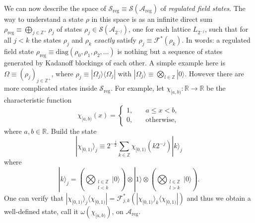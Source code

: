 \documentclass[11pt]{amsart}
\theoremstyle{plain}%
\theoremstyle{definition}
\theoremstyle{remark}
\begin{document}
We can now describe the space of $\mathcal{S}_{\text{reg}} \equiv \mathcal{S}(\mathcal{A}_{\text{reg}})$ of \emph{regulated field states}. The way to understand a state $\rho$ in this space is as an infinite direct sum $\rho_{\text{reg}} \equiv \bigoplus_{j\in \mathbb{Z}^{+}} \rho_{j}$ of states $\rho_{j} \in \mathcal{S}(\mathcal{A}_{2^{-j}})$, one for each lattice $L_{2^{-j}}$, such that for all $j<k$ the states $\rho_j$ and $\rho_k$ \emph{exactly} satisfy $\rho_j \equiv \mathcal{F}^{*}(\rho_k)$. In words: a regulated field state $\rho_{\text{reg}} \equiv \text{diag}(\rho_0, \rho_1, \rho_2, \ldots)$ is nothing but a sequence of states generated by Kadanoff blockings of each other. A simple example here is $\Omega \equiv (\rho_j)_{j\in \mathbb{Z}^+}$, where $\rho_j \equiv |\Omega_j\rangle\langle \Omega_j|$ with $|\Omega_j\rangle \equiv \bigotimes_{l\in \mathbb{Z}} |0\rangle$. However there are more complicated states inside $\mathcal{S}_{\text{reg}}$. For example, let $\chi_{[a,b)}:\mathbb{R}\rightarrow\mathbb{R}$ be the characteristic function
\begin{equation}
	\chi_{[a,b)}(x) = \begin{cases} 1,& \quad a\le x < b, \\ 0,& \quad \text{otherwise,}\end{cases}
\end{equation}
where $a,b\in\mathbb{R}$. Build the state
\begin{equation}
	|\chi_{[0,1)}\rangle_j \equiv 2^{-\frac{j}{2}}\sum_{k\in \mathbb{Z}} \chi_{[0,1)}(k2^{-j}) |k\rangle_j
\end{equation}
where 
\begin{equation}
	|k\rangle_j = \left(\bigotimes_{\substack{l\in\mathbb{Z} \\ l < k}} |0\rangle \right)\otimes |1\rangle \otimes\left(\bigotimes_{\substack{l\in\mathbb{Z} \\ l > k}} |0\rangle \right).
\end{equation}
One can verify that $|\chi_{[0,1)}\rangle_j\langle \chi_{[0,1)}| = \mathcal{F}_{j,k}^{*}(|\chi_{[0,1)}\rangle_k\langle \chi_{[0,1)}|)$ and thus we obtain a well-defined state, call it $\omega(\chi_{[a,b)})$, on $\mathcal{A}_{\text{reg}}$.
\end{document}
